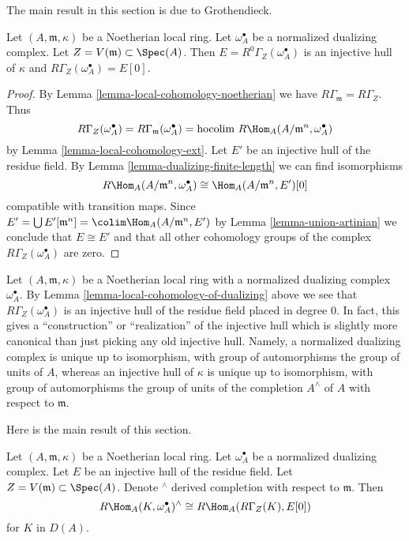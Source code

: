\noindent
The main result in this section is due to Grothendieck.

\begin{lemma}
\label{lemma-local-cohomology-of-dualizing}
Let $(A, \mathfrak m, \kappa)$ be a Noetherian local ring.
Let $\omega_A^\bullet$ be a normalized dualizing complex.
Let $Z = V(\mathfrak m) \subset \Spec(A)$.
Then $E = R^0\Gamma_Z(\omega_A^\bullet)$ is an injective hull of
$\kappa$ and $R\Gamma_Z(\omega_A^\bullet) = E[0]$.
\end{lemma}

\begin{proof}
By Lemma \ref{lemma-local-cohomology-noetherian} we have
$R\Gamma_{\mathfrak m} = R\Gamma_Z$. Thus
$$
R\Gamma_Z(\omega_A^\bullet) =
R\Gamma_{\mathfrak m}(\omega_A^\bullet) =
\text{hocolim}\ R\Hom_A(A/\mathfrak m^n, \omega_A^\bullet)
$$
by Lemma \ref{lemma-local-cohomology-ext}. Let $E'$ be an injective
hull of the residue field.
By Lemma \ref{lemma-dualizing-finite-length}
we can find isomorphisms
$$
R\Hom_A(A/\mathfrak m^n, \omega_A^\bullet) \cong \Hom_A(A/\mathfrak m^n, E')[0]
$$
compatible with transition maps. Since
$E' = \bigcup E'[\mathfrak m^n] = \colim \Hom_A(A/\mathfrak m^n, E')$
by Lemma \ref{lemma-union-artinian}
we conclude that $E \cong E'$ and that all other cohomology
groups of the complex $R\Gamma_Z(\omega_A^\bullet)$ are zero.
\end{proof}

\begin{remark}
\label{remark-specific-injective-hull}
Let $(A, \mathfrak m, \kappa)$ be a Noetherian local ring
with a normalized dualizing complex $\omega_A^\bullet$.
By Lemma \ref{lemma-local-cohomology-of-dualizing}
above we see that $R\Gamma_Z(\omega_A^\bullet)$
is an injective hull of the residue field placed in degree $0$.
In fact, this gives a ``construction'' or ``realization''
of the injective hull which is slightly more canonical than
just picking any old injective hull. Namely, a normalized
dualizing complex is unique up to isomorphism, with group
of automorphisms the group of units of $A$, whereas an
injective hull of $\kappa$ is unique up to isomorphism, with
group of automorphisms the group of units of the completion
$A^\wedge$ of $A$ with respect to $\mathfrak m$.
\end{remark}

\noindent
Here is the main result of this section.

\begin{theorem}
\label{theorem-local-duality}
Let $(A, \mathfrak m, \kappa)$ be a Noetherian local ring.
Let $\omega_A^\bullet$ be a normalized dualizing complex.
Let $E$ be an injective hull of the residue field.
Let $Z = V(\mathfrak m) \subset \Spec(A)$.
Denote ${}^\wedge$ derived completion with respect to $\mathfrak m$.
Then
$$
R\Hom_A(K, \omega_A^\bullet)^\wedge \cong R\Hom_A(R\Gamma_Z(K), E[0])
$$
for $K$ in $D(A)$.
\end{theorem}

